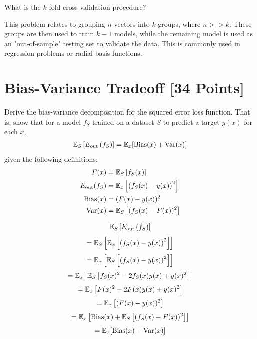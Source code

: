 \begin{problem}[2]
  What is the $k$-fold cross-validation procedure?
\end{problem}
\begin{solution}
  This problem relates to grouping $n$ vectors into $k$ groups, where $n >> k$. These groups are then used to train $k-1$ models, while the remaining model is used as an "out-of-sample" testing set to validate the data. This is commonly used in regression problems or radial basis functions.


\end{solution}




\newpage
\section{Bias-Variance Tradeoff [34 Points]}

\begin{problem}[5]
  Derive the bias-variance decomposition for the squared error loss function. That is, show that for a model $f_S$ trained on a dataset $S$ to predict a target $y(x)$ for each $x$,
  \begin{align*}
    \mathbb{E}_S \left[E_\text{out}\left(f_S\right)\right] = \mathbb{E}_x[\operatorname{Bias}(x) + \operatorname{Var}(x)]
  \end{align*}
  given the following definitions:
  \begin{align*}
    F(x) &= \mathbb{E}_S\left[f_S(x) \right] \\
    E_\text{out}(f_S) &= \mathbb{E}_x\left[\left(f_S(x) - y(x)\right)^2\right] \\
    \operatorname{Bias}(x) &= (F(x) - y(x))^2 \\
    \operatorname{Var}(x) &= \mathbb{E}_S\left[(f_S(x)-F(x))^2\right]
  \end{align*}
\end{problem}

\begin{solution}
$$
\mathbb{E}_S \left[E_\text{out}\left(f_S\right)\right]
$$$$
= \mathbb{E}_S \left[  \mathbb{E}_x\left[\left(f_S(x) - y(x)\right)^2\right] \right]
$$$$
= \mathbb{E}_x \left[ \mathbb{E}_S\left[\left(f_S(x) - y(x)\right)^2\right] \right]
$$$$
= \mathbb{E}_x \left[ \mathbb{E}_S\left[f_S(x)^2 - 2f_S(x)y(x) + y(x)^2\right] \right]
$$$$
= \mathbb{E}_x \left[F(x)^2 -2F(x)y(x) + y(x)^2 \right]
$$$$
= \mathbb{E}_x \left[(F(x) - y(x))^2 \right]
$$$$
= \mathbb{E}_x \left[\operatorname{Bias}(x) + \mathbb{E}_S\left[(f_S(x)-F(x))^2\right] \right]
$$$$
= \mathbb{E}_x[\operatorname{Bias}(x) + \operatorname{Var}(x)]
$$
\end{solution}

